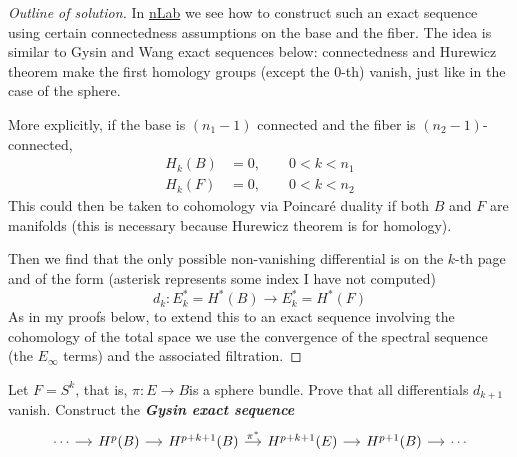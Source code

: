 \iffalse\begin{proof}[Solution]\leavevmode
	We know that
	\begin{align*}
		\beta\in\operatorname{img} \pi^*& \iff \beta c=\alpha(\pi c),\qquad \alpha\in H^{2}(B), c\text{ chain in } E\\
		\beta\in\ker \tau^*&\iff \beta c=0, \qquad\qquad  \forall c \text{ chain in }F 
	\end{align*}
	Looks like any $\beta\in \operatorname{img} \pi^*$ will be zero on the chains of $F$ because the projection will collapse them to points (but I'm not sure that a cochain representing the cohomology class will vanish on a point just because it's a point…).
\end{proof}\fi

\begin{proof}[Outline of solution]\leavevmode
	In \href{https://ncatlab.org/nlab/show/Serre+long+exact+sequence}{nLab} we see how to construct such an exact sequence using certain connectedness assumptions on the base and the fiber. The idea is similar to Gysin and Wang exact sequences below: connectedness and Hurewicz theorem make the first homology groups (except the 0-th) vanish, just like in the case of the sphere.

	More explicitly, if the base is $(n_1-1)$ connected and the fiber is $(n_2-1)$-connected,
	\begin{align*}
		H_{k}(B)&=0,\qquad 0<k<n_1\\
		H_{k}(F)&=0,\qquad 0<k<n_2
	\end{align*}
This could then be taken to cohomology via Poincar\'e duality if both $B$ and $F$ are manifolds (this is necessary because Hurewicz theorem is for homology).

Then we find that the only possible non-vanishing differential is on the $k$-th page and of the form (asterisk represents some index I have not computed)
\[d_k:E_k^*=H^*(B)\longrightarrow E_k^{*}=H^*(F)\]
	As in my proofs below, to extend this to an exact sequence involving the cohomology of the total space we use the convergence of the spectral sequence (the $E_{\infty}$ terms) and the associated filtration.
\end{proof}

\begin{manualexercise}{2.8}
	Let $F=S^k$, that is, $\pi:E\to B$is a sphere bundle. Prove that all differentials $d_{k+1}$ vanish. Construct the \textit{\textbf{Gysin exact sequence}} 
	\[\begin{tikzcd}[column sep=small]
		\cdots\arrow[r]&H^{p}(B)\arrow[r]&H^{p+k+1}(B)\arrow[r,"\pi^*"]&H^{p+k+1}(E)\arrow[r]&H^{p+1}(B)\arrow[r]&\cdots
	\end{tikzcd}\]
\end{manualexercise}

